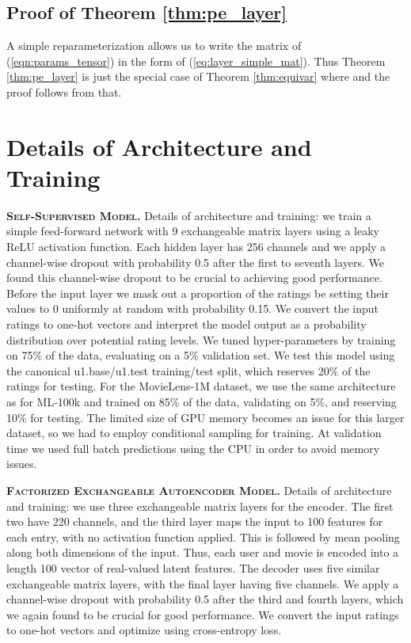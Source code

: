 \documentclass{article}
\theoremstyle{definition}
\begin{document}
\subsection{Proof of Theorem \ref{thm:pe_layer}}
A simple reparameterization allows us to write the matrix  of (\ref{eqn:params_tensor}) in the form of (\ref{eq:layer_simple_mat}). Thus Theorem \ref{thm:pe_layer} is just the special case of Theorem \ref{thm:equivar} where  and the proof follows from that. 

\section{Details of Architecture and Training}

\textbf{\textsc{Self-Supervised Model.}}
Details of architecture and training: we train a simple feed-forward network with 9 exchangeable matrix layers using a leaky ReLU activation function. Each hidden layer has 256 channels and we apply a channel-wise dropout with probability 0.5 after the first to seventh layers. We found this channel-wise dropout to be crucial to achieving good performance. Before the input layer we mask out a proportion of the ratings be setting their values to 0 uniformly at random with probability 0.15. We convert the input ratings to one-hot vectors and interpret the model output as a probability distribution over potential rating levels. We tuned hyper-parameters by training on 75\% of the data, evaluating on a 5\% validation set. We test this model using the canonical u1.base/u1.test training/test split, which reserves 20\% of the ratings for testing.
For the MovieLens-1M dataset, we use the same architecture as for ML-100k and trained on 85\% of the data, validating on 5\%, and reserving 10\% for testing. The limited size of GPU memory becomes an issue for this larger dataset, so we had to employ conditional sampling for training. At validation time we used full batch predictions using the CPU in order to avoid memory issues.

\textbf{\textsc{Factorized Exchangeable Autoencoder Model.}}
Details of architecture and training: we use three exchangeable matrix layers for the encoder. The first two have 220 channels, and the third layer maps the input to 100 features for each entry, with no activation function applied. This is followed by mean pooling along both dimensions of the input. Thus, each user and movie is encoded into a length 100 vector of real-valued latent features. The decoder uses five similar exchangeable matrix layers, with the final layer having five channels. We apply a channel-wise dropout with probability 0.5 after the third and fourth layers, which we again found to be crucial for good performance. We convert the input ratings to one-hot vectors and optimize using cross-entropy loss.
\end{document}
